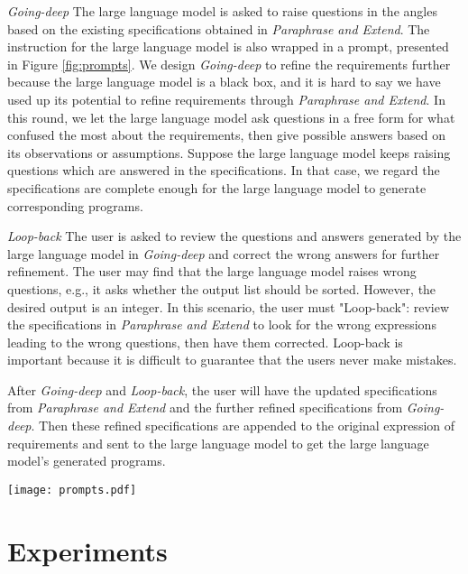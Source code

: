 \documentclass[sigconf]{acmart}
\begin{document}
\textit{Going-deep} The large language model is asked to raise questions in the angles based on the existing specifications obtained in \textit{Paraphrase and Extend}. The instruction for the large language model is also wrapped in a prompt, presented in Figure \ref{fig:prompts}. We design \textit{Going-deep} to refine the requirements further because the large language model is a black box, and it is hard to say we have used up its potential to refine requirements through \textit{Paraphrase and Extend}. In this round, we let the large language model ask questions in a free form for what confused the most about the requirements, then give possible answers based on its observations or assumptions. Suppose the large language model keeps raising questions which are answered in the specifications. In that case, we regard the specifications are complete enough for the large language model to generate corresponding programs.

\textit{Loop-back} The user is asked to review the questions and answers generated by the large language model in \textit{Going-deep} and correct the wrong answers for further refinement. The user may find that the large language model raises wrong questions, e.g., it asks whether the output list should be sorted. However, the desired output is an integer. In this scenario, the user must "Loop-back": review the specifications in \textit{Paraphrase and Extend} to look for the wrong expressions leading to the wrong questions, then have them corrected. Loop-back is important because it is difficult to guarantee that the users never make mistakes. 

After \textit{Going-deep} and \textit{Loop-back}, the user will have the updated specifications from \textit{Paraphrase and Extend} and the further refined specifications from \textit{Going-deep}. Then these refined specifications are appended to the original expression of requirements and sent to the large language model to get the large language model's generated programs.

\begin{figure*}[htbp]
    \centering
    \texttt{[image: prompts.pdf]}
    \caption{Prompts for Large Language Models and Example Outputs}
    \label{fig:prompts}
\end{figure*}
\section{Experiments}
\end{document}
